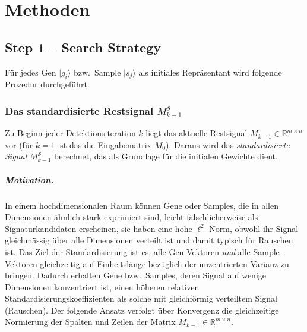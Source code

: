 
\chapter{Methoden}
\section{Step 1 -- Search Strategy}
 
Für jedes Gen $|g_i\rangle$ bzw.\ Sample $|s_j\rangle$ als initiales Repräsentant
wird folgende Prozedur durchgeführt.
 
\subsection*{Das standardisierte Restsignal $M^{\mathcal{S}}_{k-1}$}
 
Zu Beginn jeder Detektionsiteration $k$ liegt das aktuelle Restsignal
$M_{k-1} \in \mathbb{R}^{m \times n}$ vor (f\"{u}r $k=1$ ist das die Eingabematrix
$M_0$).  Daraus wird das \emph{standardisierte Signal} $M^{\mathcal{S}}_{k-1}$
berechnet, das als Grundlage f\"{u}r die initialen Gewichte dient.
 
\paragraph{Motivation.}
In einem hochdimensionalen Raum können Gene oder Samples, die in
allen Dimensionen ähnlich stark exprimiert sind, leicht fälschlicherweise
als Signaturkandidaten erscheinen, sie haben eine hohe $\ell^2$-Norm,
obwohl ihr Signal gleichmässig über alle Dimensionen verteilt ist und
damit typisch für Rauschen ist.
Das Ziel der Standardisierung ist es, alle Gen-Vektoren
\emph{und} alle Sample-Vektoren gleichzeitig auf Einheitslänge
bezüglich der unzentrierten Varianz zu bringen.
Dadurch erhalten Gene bzw.\ Samples, deren Signal auf wenige Dimensionen
konzentriert ist, einen höheren relativen
Standardisierungskoeffizienten als solche mit gleichförmig verteiltem
Signal (Rauschen). Der folgende Ansatz verfolgt über Konvergenz die gleichzeitige Normierung der Spalten und Zeilen der Matrix $M_{k-1} \in \mathbb{R}^{m \times n}$.
 
